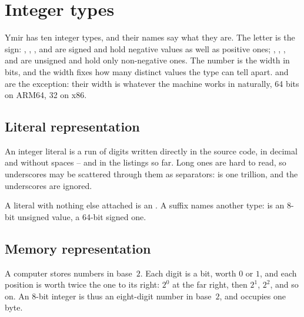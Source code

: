\vfill\pagebreak
\section{Integer types}
\label{sec:types:integers}

Ymir has ten integer types, and their names say what they are. The letter is the
sign: , , ,  and  are
signed and hold negative values as well as positive ones; ,
, ,  and  are unsigned and hold
only non-negative ones. The number is the width in bits, and the width fixes how
many distinct values the type can tell apart.  and 
are the exception: their width is whatever the machine works in naturally, 64
bits on ARM64, 32 on x86.

\subsection{Literal representation}
\label{sec:types:integer_literals}

An integer literal is a run of digits written directly in the source code, in
decimal and without spaces --  and  in the listings so far.
Long ones are hard to read, so underscores may be scattered through them as
separators:  is one trillion, and the underscores
are ignored.

A literal with nothing else attached is an . A suffix names another
type:  is an 8-bit unsigned value,  a 64-bit signed
one.


\subsection{Memory representation}
\label{sec:types:integer_memory}

A computer stores numbers in base~$2$. Each digit is a bit, worth $0$ or $1$, and
each position is worth twice the one to its right: $2^0$ at the far right, then
$2^1$, $2^2$, and so on. An 8-bit integer is thus an eight-digit number in
base~$2$, and occupies one byte.




